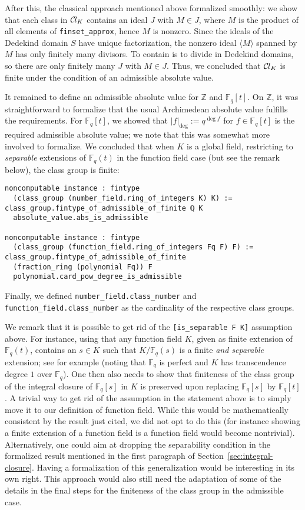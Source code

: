 \documentclass[sn-mathphys]{sn-jnl}%
\newcommand{\lean}[1]{\texttt{#1}\xspace}
\newcommand*{\Cl}{\mathcal{C}\kern-.075em l}
\newcommand*{\Fq}[1][q]{\mathbb{F}_{#1}}
\renewcommand{\Z}{\mathbb{Z}}
\begin{document}
After this, the classical approach mentioned above formalized smoothly:
we show that each class in $\Cl_{K}$ contains an ideal $J$ with $M \in J$,
where $M$ is the product of all elements of \lean{finset\_approx}, hence $M$ is nonzero.
Since the ideals of the Dedekind domain $S$ have unique factorization,
the nonzero ideal $\langle M \rangle$ spanned by $M$ has only finitely many divisors.
To contain is to divide in Dedekind domains, so there are only finitely many $J$ with $M \in J$.
Thus, we concluded that $\Cl_{K}$ is finite under the condition of an admissible absolute value.

It remained to define an admissible absolute value for $\Z$ and $\Fq[q][t]$. On $\Z$, it was straightforward to formalize that the usual Archimedean absolute value fulfills the requirements. For $\Fq[q][t]$, we showed that $\lvert f\rvert_{\deg}:=q^{\deg f}$ for $f \in \Fq[q][t]$ is the required admissible absolute value; we note that this was somewhat more involved to formalize.
We concluded that when $K$ is a global field, restricting to \emph{separable} extensions of $\Fq[q](t)$ in the function field case (but see the remark below), the class group is finite:
\begin{lstlisting}
noncomputable instance : fintype
  (class_group (number_field.ring_of_integers K) K) :=
class_group.fintype_of_admissible_of_finite ℚ K
  absolute_value.abs_is_admissible

noncomputable instance : fintype
  (class_group (function_field.ring_of_integers Fq F) F) :=
class_group.fintype_of_admissible_of_finite
  (fraction_ring (polynomial Fq)) F
  polynomial.card_pow_degree_is_admissible
\end{lstlisting}

Finally, we defined \lean{number\_field.class\_number} and \lean{function\_\-field.\linebreak[0]class\_\-number} as the cardinality of the respective class groups.

We remark that it is possible to get rid of the \lean{[is\_separable F K]} assumption above. 
For instance, using that any function field $K$, given as finite extension of $\Fq[q](t)$, contains an $s \in K$ such that $K/\Fq[q](s)$ is a finite \emph{and separable} extension; see for example \cite[Corollary 4.4 in Chapter VIII]{Lang} (noting that $\Fq$ is perfect and $K$ has transcendence degree $1$ over $\Fq$).
One then also needs to show that finiteness of the class group of the integral closure of $\Fq[q][s]$ in $K$ is preserved upon replacing $\Fq[q][s]$ by $\Fq[q][t]$.
A trivial way to get rid of the assumption in the statement above is to simply move it to our definition of function field.
While this would be mathematically consistent by the result just cited, we did not opt to do this (for instance showing a finite extension of a function field is a function field
would become nontrivial).
Alternatively, one could aim at dropping the separability condition in the formalized result mentioned in the first paragraph of Section~\ref{sec:integral-closure}.
Having a formalization of this generalization would be interesting in its own right.
This approach would also still need the adaptation of some of the details in the final steps for the finiteness of the class group in the admissible case.
\end{document}
